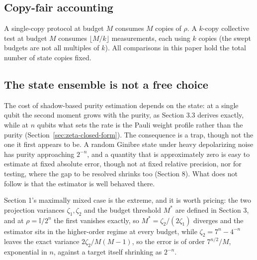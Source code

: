 \documentclass[a4paper,superscriptaddress,nofootinbib,onecolumn,nopdfoutputerror]{quantumarticle}
\begin{document}
\hypertarget{copy-fair-accounting}{%
\subsection{Copy-fair accounting}\label{copy-fair-accounting}}

A single-copy protocol at budget \(M\) consumes \(M\) copies of
\(\rho\). A \(k\)-copy collective test at budget \(M\) consumes \(\lfloor M/k \rfloor\)
measurements, each using \(k\) copies (the swept budgets are not all multiples of \(k\)). All comparisons in this paper
hold the total number of state copies fixed.

\hypertarget{the-state-ensemble-is-not-a-free-choice}{%
\subsection{The state ensemble is not a free
choice}\label{the-state-ensemble-is-not-a-free-choice}}

The cost of shadow-based purity estimation depends on the state: at a single qubit the second
moment grows with the purity, as Section 3.3 derives exactly, while at \(n\) qubits what sets the
rate is the Pauli weight profile rather than the purity (Section~\ref{sec:zeta-closed-form}). The
consequence is a trap, though not the one it first appears to be. A random
Ginibre state under heavy depolarizing noise has purity approaching
\(2^{-n}\), and a quantity that is approximately zero is easy to estimate
at fixed absolute error, though not at fixed relative precision, nor
for testing, where the gap to be resolved shrinks too (Section 8). What
does not follow is that the estimator is well behaved there.

Section 1's maximally mixed case is the extreme, and it is worth pricing: the two projection variances
\(\zeta_1, \zeta_2\) and the budget threshold \(M^*\) are defined in Section 3, and at
\(\rho = \mathbb{I}/2^n\) the first vanishes exactly, so \(M^* = \zeta_2/(2\zeta_1)\)
diverges and the estimator sits in the higher-order regime at every budget, while \(\zeta_2 = 7^n - 4^{-n}\) leaves the exact variance \(2\zeta_2 / M(M-1)\), so the
error is of order \(7^{n/2}/M\), exponential in \(n\), against a target itself shrinking as
\(2^{-n}\).
\end{document}
